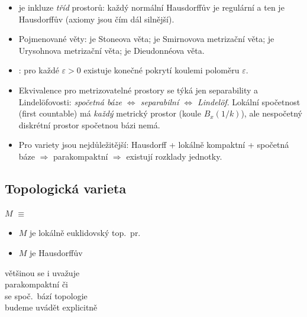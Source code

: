 \begin{vysvetleni}
\begin{itemize}[nosep]
  \item {} je inkluze \emph{tříd} prostorů: každý normální Hausdorffův je regulární a ten je Hausdorffův (axiomy jsou čím dál silnější).
  \item Pojmenované věty:  je Stoneova věta;  je Smirnovova metrizační věta;  je Urysohnova metrizační věta;  je Dieudonnéova věta.
  \item {}: pro každé $\varepsilon>0$ existuje konečné pokrytí koulemi poloměru $\varepsilon$.
  \item Ekvivalence pro metrizovatelné prostory se týká jen separability a Lindelöfovosti: \emph{spočetná báze $\Leftrightarrow$ separabilní $\Leftrightarrow$ Lindelöf}. Lokální spočetnost (first countable) má \emph{každý} metrický prostor (koule $B_x(1/k)$), ale nespočetný diskrétní prostor spočetnou bázi nemá.
  \item Pro variety jsou nejdůležitější: Hausdorff + lokálně kompaktní + spočetná báze $\Rightarrow$ parakompaktní $\Rightarrow$ existují rozklady jednotky.
\end{itemize}
\end{vysvetleni}

\subsection{Topologická varieta}

\begin{definice}
 $M$ $\equiv$
\begin{itemize}[nosep]
  \item[] $M$ je lokálně euklidovský top.\ pr.
  \item[] $M$ je Hausdorffův
\end{itemize}
většinou se i uvažuje \\
\quad parakompaktní či \\
\quad se spoč.\ bází topologie \\
budeme uvádět explicitně
\end{definice}

